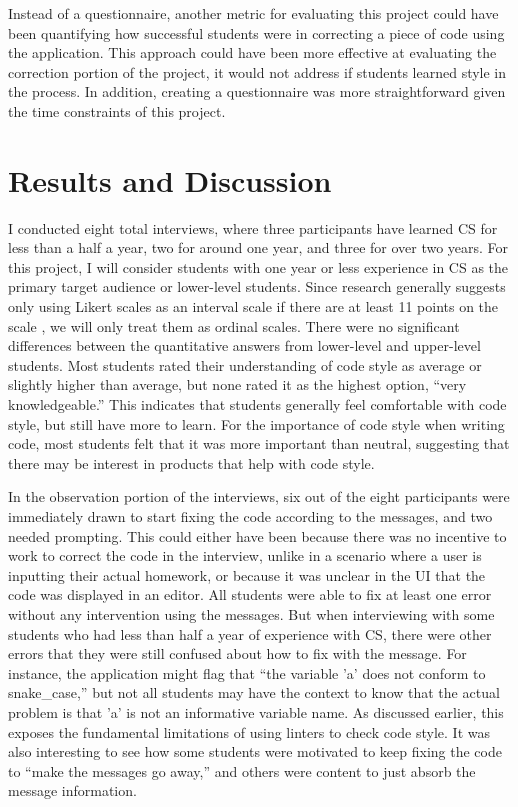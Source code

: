 \documentclass[10pt,twocolumn]{article}
\begin{document}
Instead of a questionnaire, another metric for evaluating this project could have been quantifying how successful students were in correcting a piece of code using the application. 
This approach could have been more effective at evaluating the correction portion of the project, it would not address if students learned style in the process. 
In addition, creating a questionnaire was more straightforward given the time constraints of this project. 


\section{Results and Discussion}
I conducted eight total interviews, where three participants have learned CS for less than a half a year, two for around one year, and three for over two years. 
For this project, I will consider students with one year or less experience in CS as the primary target audience or lower-level students. 
Since research generally suggests only using Likert scales as an interval scale if there are at least 11 points on the scale \cite{wu_2017}, we will only treat them as ordinal scales. 
There were no significant differences between the quantitative answers from lower-level and upper-level students. 
Most students rated their understanding of code style as average or slightly higher than average, but none rated it as the highest option, “very knowledgeable.”
This indicates that students generally feel comfortable with code style, but still have more to learn. 
For the importance of code style when writing code, most students felt that it was more important than neutral, suggesting that there may be interest in products that help with code style. 

In the observation portion of the interviews, six out of the eight participants were immediately drawn to start fixing the code according to the messages, and two needed prompting. 
This could either have been because there was no incentive to work to correct the code in the interview, unlike in a scenario where a user is inputting their actual homework, or because it was unclear in the UI that the code was displayed in an editor. 
All students were able to fix at least one error without any intervention using the messages. 
But when interviewing with some students who had less than half a year of experience with CS, there were other errors that they were still confused about how to fix with the message. 
For instance, the application might flag that “the variable 'a' does not conform to snake\_case,” but not all students may have the context to know that the actual problem is that 'a' is not an informative variable name. 
As discussed earlier, this exposes the fundamental limitations of using linters to check code style.
It was also interesting to see how some students were motivated to keep fixing the code to “make the messages go away,” and others were content to just absorb the message information. 
\end{document}
